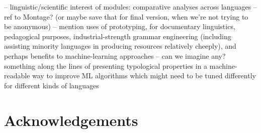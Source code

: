 \documentclass[11pt]{article}
\begin{document}
-- linguistic/scientific interest of modules: comparative analyses
across languages
-- ref to Montage? (or maybe save that for final version, when 
we're not trying to be anonymous)
-- mention uses of prototyping, for documentary linguistics, pedagogical
purposes, industrial-strength grammar engineering (including assisting
minority languages in producing resources relatively cheeply), and perhaps
benefits to machine-learning approaches -- can we imagine any?  something
along the lines of presenting typological properties in a machine-readable
way to improve ML algorithms which might need to be tuned differently for
different kinds of languages

\section*{Acknowledgements}



%

\end{document}
